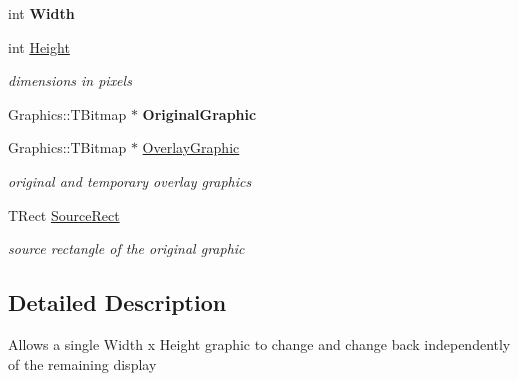 \begin{DoxyCompactItemize}
\mbox{\label{class_t_graphic_element_a5449d46461dbf9108441020cdd00c0ae}} 
int {\bfseries Width}
\item 
\mbox{\label{class_t_graphic_element_aa7e2feb822e3a00228b582e0c8b6d277}} 
int \mbox{\hyperlink{class_t_graphic_element_aa7e2feb822e3a00228b582e0c8b6d277}{Height}}
\begin{DoxyCompactList}\small\item\em dimensions in pixels \end{DoxyCompactList}\item 
\mbox{\label{class_t_graphic_element_a5de04c4143742c4247e4015dc7554fad}} 
Graphics\+::\+T\+Bitmap $\ast$ {\bfseries Original\+Graphic}
\item 
\mbox{\label{class_t_graphic_element_a129fc709d76f28924aa71d2f8ba1ecc7}} 
Graphics\+::\+T\+Bitmap $\ast$ \mbox{\hyperlink{class_t_graphic_element_a129fc709d76f28924aa71d2f8ba1ecc7}{Overlay\+Graphic}}
\begin{DoxyCompactList}\small\item\em original and temporary overlay graphics \end{DoxyCompactList}\item 
\mbox{\label{class_t_graphic_element_af4a75f077eac76c1f14c66571ff2f3b3}} 
T\+Rect \mbox{\hyperlink{class_t_graphic_element_af4a75f077eac76c1f14c66571ff2f3b3}{Source\+Rect}}
\begin{DoxyCompactList}\small\item\em source rectangle of the original graphic \end{DoxyCompactList}\end{DoxyCompactItemize}


\subsection{Detailed Description}
Allows a single Width x Height graphic to change and change back independently of the remaining display

